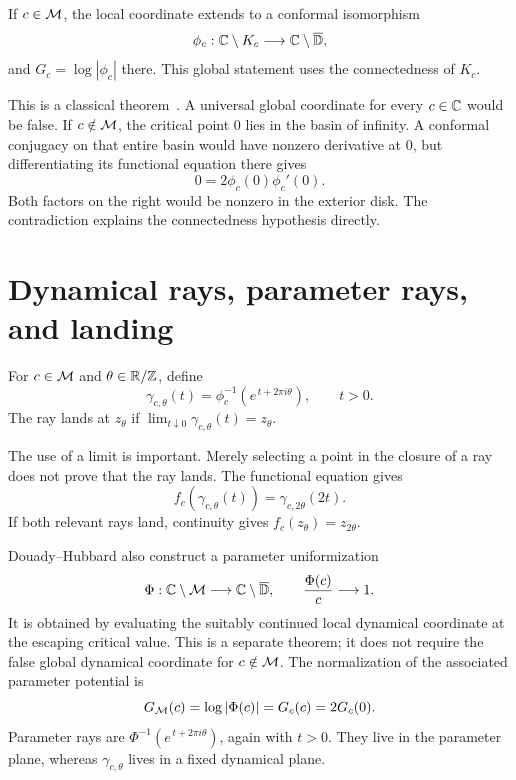 \begin{theorem}
\label{thm:global-bottcher}
If $c\in\mathcal M$, the local coordinate extends to a conformal isomorphism
\[
 \phi_c:\mathbb C\setminus K_c\longrightarrow\mathbb C\setminus\overline{\mathbb D},
\]
and $G_c=\log|\phi_c|$ there.  This global statement uses the
connectedness of $K_c$.
\end{theorem}

This is a classical theorem~\cite{DH,LyubichBook}.  A universal global
coordinate for every $c\in\mathbb C$ would be false.  If $c\notin\mathcal M$, the
critical point $0$ lies in the basin of infinity.  A conformal
conjugacy on that entire basin would have nonzero derivative at $0$,
but differentiating its functional equation there gives
\[
 0=2\phi_c(0)\phi_c'(0).
\]
Both factors on the right would be nonzero in the exterior disk.
The contradiction explains the connectedness hypothesis directly.

\section{Dynamical rays, parameter rays, and landing}

\begin{definition}
\label{def:external-ray}
For $c\in\mathcal M$ and $\theta\in\mathbb R/\mathbb Z$, define
\[
 \gamma_{c,\theta}(t)=
       \phi_c^{-1}(e^{\,t+2\pi i\theta}),\qquad t>0.
\]
The ray lands at $z_\theta$ if
$\lim_{t\downarrow0}\gamma_{c,\theta}(t)=z_\theta$.
\end{definition}

The use of a limit is important.  Merely selecting a point in the
closure of a ray does not prove that the ray lands.  The functional
equation gives
\[
 f_c(\gamma_{c,\theta}(t))=\gamma_{c,2\theta}(2t).
\]
If both relevant rays land, continuity gives
$f_c(z_\theta)=z_{2\theta}$.

Douady--Hubbard also construct a parameter uniformization
\[
 \Phi:\mathbb C\setminus\mathcal M\longrightarrow
                 \mathbb C\setminus\overline{\mathbb D},
 \qquad \frac{\Phi(c)}c\longrightarrow1.
\]
It is obtained by evaluating the suitably continued local dynamical
coordinate at the escaping critical value.  This is a separate theorem;
it does not require the false global dynamical coordinate for
$c\notin\mathcal M$.  The normalization of the associated parameter potential is
\[
 G_{\mathcal M}(c)=\log|\Phi(c)|=G_c(c)=2G_c(0).
\]
Parameter rays are
$\Phi^{-1}(e^{\,t+2\pi i\theta})$, again with $t>0$.
They live in the parameter plane, whereas
$\gamma_{c,\theta}$ lives in a fixed dynamical plane.

